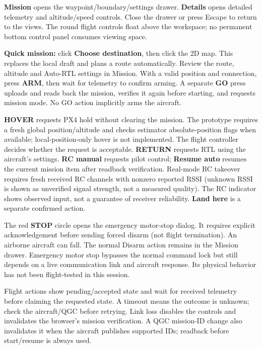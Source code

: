 \documentclass[11pt]{article}
\begin{document}
\textbf{Mission} opens the waypoint/boundary/settings drawer. \textbf{Details}
opens detailed telemetry and altitude/speed controls. Close the drawer or press
Escape to return to the views. The round flight controls float above the workspace;
no permanent bottom control panel consumes viewing space.

\textbf{Quick mission:} click \textbf{Choose destination}, then click the 2D map.
This replaces the local draft and plans a route automatically. Review the route,
altitude and Auto-RTL settings in Mission. With a valid position and connection,
press \textbf{ARM}, then wait for telemetry to confirm arming. A separate
\textbf{GO} press uploads and reads back the mission, verifies it again before
starting, and requests mission mode. No GO action implicitly arms the aircraft.

\textbf{HOVER} requests PX4 hold without clearing the mission. The prototype
requires a fresh global position/altitude and checks estimator absolute-position
flags when available; local-position-only hover is not implemented. The flight
controller decides whether the request is acceptable. \textbf{RETURN} requests
RTL using the aircraft's settings. \textbf{RC manual} requests pilot control;
\textbf{Resume auto} resumes the current mission item after readback verification.
Real-mode RC takeover requires fresh received RC channels with nonzero reported
RSSI (unknown RSSI is shown as unverified signal strength, not a measured quality).
The RC indicator shows observed input, not a guarantee of receiver reliability.
\textbf{Land here} is a separate confirmed action.

The red \textbf{STOP} circle opens the emergency motor-stop dialog. It requires
explicit acknowledgement before sending forced disarm (not flight termination).
An airborne aircraft can fall. The normal Disarm action remains in the Mission
drawer. Emergency motor stop bypasses the normal command lock but still depends
on a live communication link and aircraft response. Its physical behavior has
not been flight-tested in this session.

Flight actions show pending/accepted state and wait for received telemetry before
claiming the requested state. A timeout means the outcome is unknown; check the
aircraft/QGC before retrying. Link loss disables the controls and invalidates the
browser's mission verification. A QGC mission-ID change also invalidates it when
the aircraft publishes supported IDs; readback before start/resume is always used.
\end{document}
